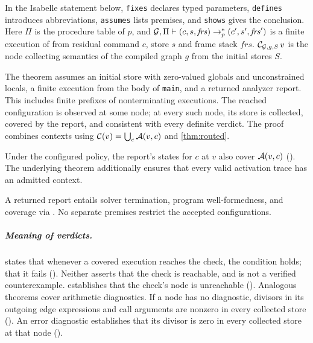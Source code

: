 In the Isabelle statement below, \texttt{fixes} declares typed parameters,
\texttt{defines} introduces abbreviations, \texttt{assumes} lists premises,
and \texttt{shows} gives the conclusion. Here $\Pi$ is the procedure table of $p$, and
$\mathcal{G}, \Pi \vdash (c, s, \mathit{frs}) \rightarrow_p^* (c', s', \mathit{frs}')$
is a finite execution of  from residual command $c$, store $s$
and frame stack $\mathit{frs}$. $\mathcal{C}_{\mathcal{G},g,S}\,v$ is the node
collecting semantics of the compiled graph $g$ from the initial stores $S$.

\begin{theorem}
\label{thm:headline}
\end{theorem}
\vspace{-1.5ex}

The theorem assumes an initial store with zero-valued globals and
unconstrained locals, a finite execution from the body of \texttt{main}, and a
returned analyzer report. This includes finite prefixes of nonterminating executions. The reached
configuration is observed at some node; at every such node, its store is
collected, covered by the report, and consistent with every definite verdict.
The proof combines contexts using $\mathcal{C}(v) = \bigcup_c \mathcal{A}(v, c)$
and \cref{thm:routed}.

Under the configured policy, the report's states for $c$ at $v$ also cover
$\mathcal{A}(v,c)$ (). The underlying
 theorem additionally ensures that every valid
activation trace has an admitted context.

A returned report entails solver termination, program well-formedness, and
coverage via . No separate premises
restrict the accepted configurations.

\subparagraph*{Meaning of verdicts.}
 states that whenever a covered execution reaches the check,
the condition holds;  that it fails
(). Neither asserts that the check is
reachable, and  is not a verified counterexample.
 establishes that the check's node is unreachable (). Analogous theorems cover
arithmetic diagnostics. If a node has no diagnostic, divisors in its outgoing
edge expressions and call arguments are nonzero in every collected store
(). An error diagnostic establishes
that its divisor is zero in every collected store at that node
().

